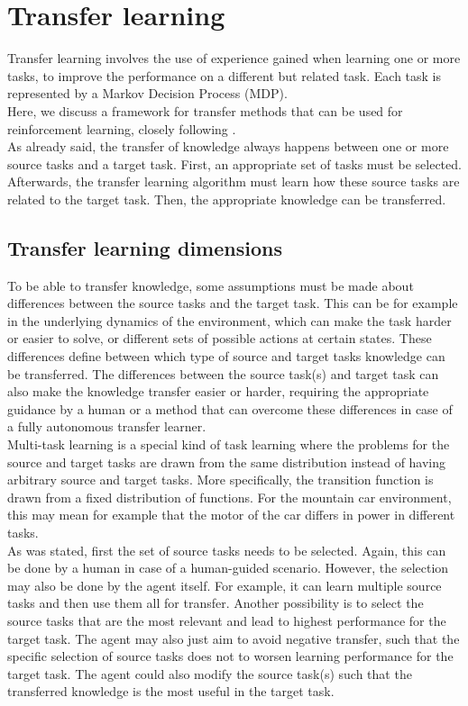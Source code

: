 \section{Transfer learning}
Transfer learning involves the use of experience gained when learning one or more tasks, to improve the performance on a different but related task. Each task is represented by a Markov Decision Process (MDP).\\  Here, we discuss a framework for transfer methods that can be used for reinforcement learning, closely following \cite{Taylor2009TransferSurvey}.\\

As already said, the transfer of knowledge always happens between one or more source tasks and a target task. First, an appropriate set of tasks must be selected. Afterwards, the transfer learning algorithm must learn how these source tasks are related to the target task. Then, the appropriate knowledge can be transferred.\\

\subsection{Transfer learning dimensions} %
\label{sub:transfer_learning_dimensions}
To be able to transfer knowledge, some assumptions must be made about differences between the source tasks and the target task. This can be for example in the underlying dynamics of the environment, which can make the task harder or easier to solve, or different sets of possible actions at certain states.
These differences define between which type of source and target tasks knowledge can be transferred. The differences between the source task(s) and target task can also make the knowledge transfer easier or harder, requiring the appropriate guidance by a human or a method that can overcome these differences in case of a fully autonomous transfer learner.\\
Multi-task learning is a special kind of task learning where the problems for the source and target tasks are drawn from the same distribution instead of having arbitrary source and target tasks. More specifically, the transition function is drawn from a fixed distribution of functions. For the mountain car environment, this may mean for example that the motor of the car differs in power in different tasks.\\

As was stated, first the set of source tasks needs to be selected. Again, this can be done by a human in case of a human-guided scenario. However, the selection may also be done by the agent itself. For example, it can learn multiple source tasks and then use them all for transfer.
Another possibility is to select the source tasks that are the most relevant and lead to highest performance for the target task. The agent may also just aim to avoid negative transfer, such that the specific selection of source tasks does not to worsen learning performance for the target task.
The agent could also modify the source task(s) such that the transferred knowledge is the most useful in the target task.\\

